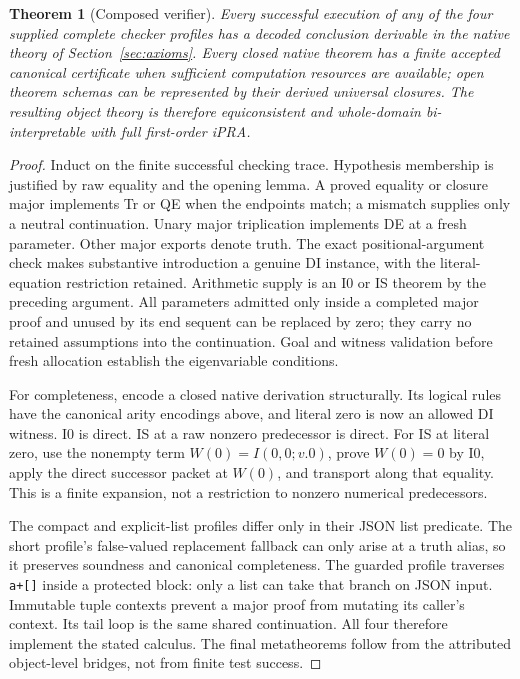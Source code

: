 \documentclass[11pt,letterpaper]{article}
\newtheorem{theorem}{Theorem}[section]
\theoremstyle{definition}\newtheorem{definition}[theorem]{Definition}
\theoremstyle{remark}\newtheorem{remark}[theorem]{Remark}
\begin{document}
\begin{theorem}[Composed verifier]
Every successful execution of any of the four supplied complete checker
profiles has a decoded conclusion derivable in the native theory of
Section~\ref{sec:axioms}. Every closed native theorem has a finite accepted
canonical certificate when sufficient computation resources are available;
open theorem schemas can be represented by their derived universal closures.
The resulting object theory is therefore equiconsistent and whole-domain
bi-interpretable with full first-order iPRA.
\end{theorem}
\begin{proof}
Induct on the finite successful checking trace. Hypothesis membership
is justified by raw equality and the opening lemma. A proved equality
or closure major implements Tr or QE when the endpoints match; a
mismatch supplies only a neutral continuation. Unary major triplication
implements DE at a fresh parameter. Other major exports denote truth.
The exact positional-argument check makes substantive introduction a
genuine DI instance, with the literal-equation restriction retained.
Arithmetic supply is an I0 or IS theorem by the preceding argument.
All parameters admitted only inside a completed major proof and unused
by its end sequent can be replaced by zero; they carry no retained
assumptions into the continuation. Goal and witness validation before
fresh allocation establish the eigenvariable conditions.

For completeness, encode a closed native derivation structurally. Its logical
rules have the canonical arity encodings above, and literal zero is now
an allowed DI witness. I0 is direct. IS at a raw nonzero predecessor is
direct. For IS at literal zero, use the nonempty term
$W(0)=I(0,0;v.0)$, prove $W(0)=0$ by I0, apply the direct successor
packet at $W(0)$, and transport along that equality. This is a finite
expansion, not a restriction to nonzero numerical predecessors.

The compact and explicit-list profiles differ only in their JSON list
predicate. The short profile's false-valued replacement fallback can
only arise at a truth alias, so it preserves soundness and canonical
completeness. The guarded profile traverses \texttt{a+[]} inside a
protected block: only a list can take that branch on JSON input.
Immutable tuple contexts prevent a major proof from mutating its caller's
context. Its tail loop is the same shared continuation. All four therefore
implement the stated calculus. The final metatheorems follow from the
attributed object-level bridges, not from finite test success.
\end{proof}
\end{document}

